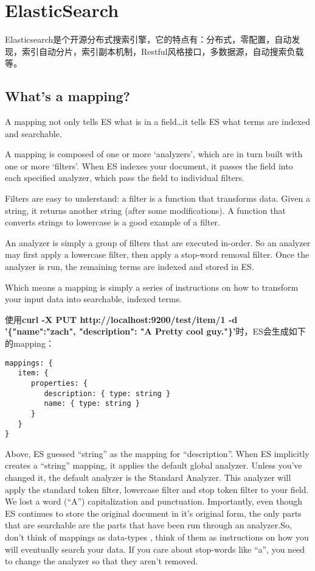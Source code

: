 \section{ElasticSearch}
Elasticsearch是个开源分布式搜索引擎，它的特点有：分布式，零配置，自动发现，索引自动分片，索引副本机制，Restful风格接口，多数据源，自动搜索负载等。
\subsection{What's a mapping?}
\par A mapping not only tells ES what is in a field…it tells ES what terms are indexed and searchable.
\par A mapping is composed of one or more ‘analyzers’, which are in turn built with one or more ‘filters’. When ES indexes your document, it passes the field into each specified analyzer, which pass the field to individual filters.
\par Filters are easy to understand: a filter is a function that transforms data. Given a string, it returns another string (after some modifications). A function that converts strings to lowercase is a good example of a filter.
\par An analyzer is simply a group of filters that are executed in-order. So an analyzer may first apply a lowercase filter, then apply a stop-word removal filter. Once the analyzer is run, the remaining terms are indexed and stored in ES.
\par Which means a mapping is simply a series of instructions on how to transform your input data into searchable, indexed terms.
\par 使用\textbf{curl -X PUT http://localhost:9200/test/item/1 -d '\{"name":"zach", "description": "A Pretty cool guy."\}'}时，ES会生成如下的mapping：
\begin{verbatim}
mappings: {
   item: {
      properties: {
         description: { type: string }
         name: { type: string }
      }
   }
}
\end{verbatim}
\par Above, ES guessed “string” as the mapping for ``description''. When ES implicitly creates a “string” mapping, it applies the default global analyzer. Unless you’ve changed it, the default analyzer is the Standard Analyzer. This analyzer will apply the standard token filter, lowercase filter and stop token filter to your field.  We lost a word (“A”) capitalization and punctuation. Importantly, even though ES continues to store the original document in it’s original form, the only parts that are searchable are the parts that have been run through an analyzer.So, don’t think of mappings as data-types , think of them as instructions on how you will eventually search your data. If you care about stop-words like “a”, you need to change the analyzer so that they aren’t removed.
